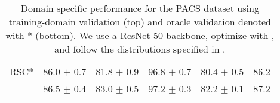 \begin{table*}
\begin{center}
\begin{tabular}{lccccc}
RSC*                  & 86.0 $\pm$ 0.7       & 81.8 $\pm$ 0.9       & 96.8 $\pm$ 0.7       & 80.4 $\pm$ 0.5       & 86.2                 \\
\tdivcams 	          & 86.5 $\pm$ 0.4       & 83.0 $\pm$ 0.5        & 97.2 $\pm$ 0.3       & 82.2 $\pm$ 0.1        & 87.2                 \\
\bottomrule
\end{tabular}
\caption[Domain specific performance for the PACS dataset]{Domain specific performance for the PACS dataset using training-domain validation (top) and  oracle validation denoted with * (bottom). We use a ResNet-50 backbone, optimize with \adam, and follow the distributions specified in \domainbed.}
\end{center}
\end{table*}


